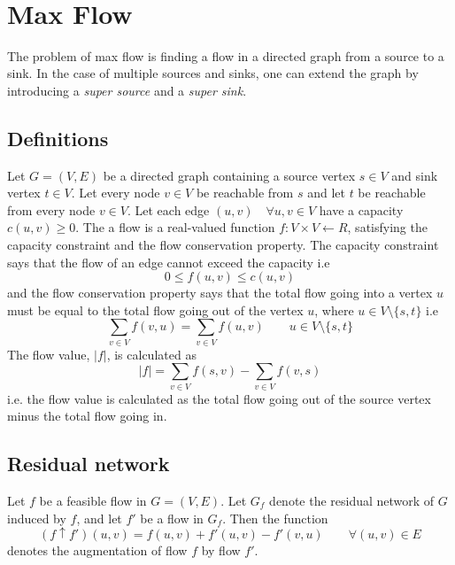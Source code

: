 \documentclass[10pt]{article}
\author{\authorName \\\texttt{\small{\authorEmail}}}
\title{\textsc{\titleName \\ \courseName}}
\begin{document}
\maketitle 

\tableofcontents
\clearpage \newpage
\section{Max Flow} %
\label{sec:max_flow}

The problem of max flow is finding a flow in a directed graph from a source to a sink. In the case of multiple sources and sinks, one can extend the graph by introducing a \emph{super source} and a \emph{super sink}.

\subsection{Definitions} %
\label{sub:definitions}
Let $G = (V,E)$ be a directed graph containing a source vertex $s \in V$ and sink vertex $t \in V$. Let every node $v \in V$ be reachable from $s$ and let $t$ be reachable from every node $v \in V$. Let each edge $(u,v) \quad \forall u,v \in V$ have a capacity $c(u,v) \geq 0$. The a flow is a real-valued function $f: V \times V \leftarrow R$, satisfying the capacity constraint and the flow conservation property. The capacity constraint says that the flow of an edge cannot exceed the capacity i.e
\begin{equation}
  0 \leq f(u,v) \leq c(u,v)
\end{equation} 
and the flow conservation property says that the total flow going into a vertex $u$ must be equal to the total flow going out of the vertex $u$, where $u \in V \setminus \{s,t\}$ i.e
\begin{equation}
  \sum_{v \in V} f(v,u) = \sum_{v \in V} f(u,v) \qquad u \in V \setminus \{s,t\}
\end{equation} 
The flow value, $|f|$, is calculated as
\begin{equation}
  |f| = \sum_{v \in V} f(s,v) - \sum_{v \in V} f(v,s)
\end{equation}
i.e. the flow value is calculated as the total flow going out of the source vertex minus the total flow going in.

\subsection{Residual network} %
\label{sub:residual_network}
Let $f$ be a feasible flow in $G = (V,E)$. Let $G_f$ denote the residual network of $G$ induced by $f$, and let $f'$ be a flow in $G_f$. Then the function 
\begin{equation}
  (f \uparrow f')(u,v) = f(u,v)+f'(u,v)-f'(v,u) \qquad \forall (u,v) \in E
\end{equation}
denotes the augmentation of flow $f$ by flow $f'$.
\end{document}
